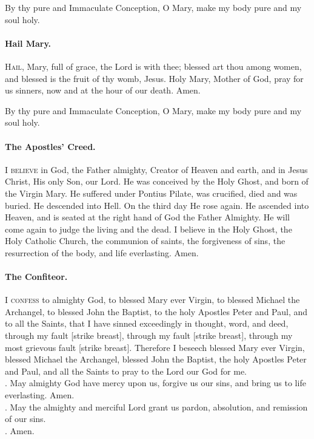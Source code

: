 \documentclass{article}
\makeatletter
\DeclareRobustCommand{\versicle}{\textbf{\vers@resp{-0.1em}{V}}}
\DeclareRobustCommand{\response}{\textbf{\vers@resp{0pt}{R}}}
\newcommand{\vers@resp@sym}{\raisebox{0.2ex}{\rotatebox[origin=c]{-20}{$\m@th\rceil$}}}
\newcommand{\vers@resp}[2]{%
  {\ooalign{\hidewidth\kern#1\vers@resp@sym\hidewidth\cr#2\cr}}%
}
\makeatother
\begin{document}
\begin{multicols}{3}
By thy pure and Immaculate Conception, O Mary, make my body pure and my soul holy.

\paragraph{Hail Mary.}
\textsc{Hail}, Mary, full of grace, the Lord is with thee;
blessed art thou among women, and blessed is the fruit of
thy womb, Jesus.  Holy Mary, Mother of God, pray for us sinners,
now and at the hour of our death. Amen.

By thy pure and Immaculate Conception, O Mary, make my body pure and my soul holy.

\paragraph{The Apostles' Creed.}
\textsc{I believe} in God, the Father almighty, Creator of Heaven and earth,
and in Jesus Christ, His only Son, our Lord. He was conceived by
the Holy Ghost, and born of the Virgin Mary. He suffered under Pontius
Pilate, was crucified, died and was buried. He descended into Hell.
On the third day He rose again. He ascended into Heaven, and is seated
at the right hand of God the Father Almighty. He will come again to
judge the living and the dead. I believe in the Holy Ghost, the Holy
Catholic Church, the communion of saints, the forgiveness of sins, the
resurrection of the body, and life everlasting. Amen. 

\paragraph{The Confiteor.}
\textsc{I confess} to almighty God, to blessed Mary ever Virgin, to blessed Michael the Archangel, to blessed John the Baptist, to the holy Apostles Peter and Paul, and to all the Saints, that I have sinned exceedingly in thought, word, and deed, through my fault [strike breast], through my fault [strike breast], through my most grievous fault [strike breast].  Therefore I beseech blessed Mary ever Virgin, blessed Michael the Archangel, blessed John the Baptist, the holy Apostles Peter and Paul, and all the Saints to pray to the Lord our God for me.\\
\response. May almighty God have mercy upon us, forgive us our sins, and bring us to life everlasting. Amen.\\
\versicle. May the almighty and merciful Lord grant us pardon, absolution, and remission of our sins.\\
\response. Amen.


\end{multicols}
\end{document}
